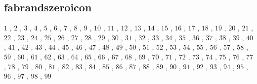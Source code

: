 \subsection{fabrandszeroicon}

$1$ , $2$ , $3$ , $4$ , $5$ , $6$ , $7$ , $8$ , $9$ , $10$ , $11$ , $12$ , $13$ , $14$ , $15$ , $16$ , $17$ , $18$ , $19$ , $20$ , $21$ , $22$ , $23$ , $24$ , $25$ , $26$ , $27$ , $28$ , $29$ , $30$ , $31$ , $32$ , $33$ , $34$ , $35$ , $36$ , $37$ , $38$ , $39$ , $40$ , $41$ , $42$ , $43$ , $44$ , $45$ , $46$ , $47$ , $48$ , $49$ , $50$ , $51$ , $52$ , $53$ , $54$ , $55$ , $56$ , $57$ , $58$ , $59$ , $60$ , $61$ , $62$ , $63$ , $64$ , $65$ , $66$ , $67$ , $68$ , $69$ , $70$ , $71$ , $72$ , $73$ , $74$ , $75$ , $76$ , $77$ , $78$ , $79$ , $80$ , $81$ , $82$ , $83$ , $84$ , $85$ , $86$ , $87$ , $88$ , $89$ , $90$ , $91$ , $92$ , $93$ , $94$ , $95$ , $96$ , $97$ , $98$ , $99$ 

